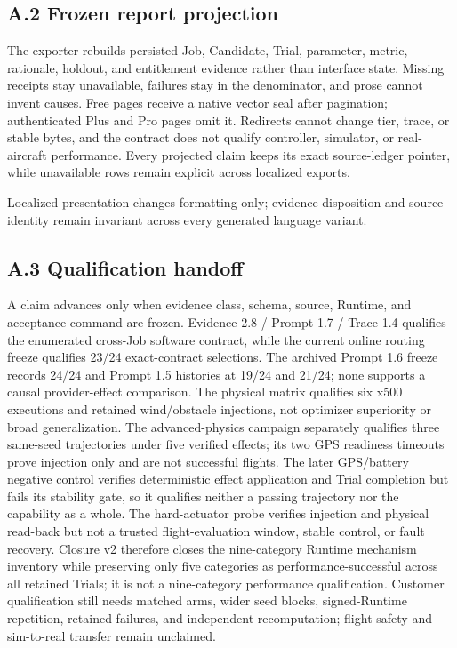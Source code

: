 \subsection{\texorpdfstring{\textbf{A.2 Frozen report
projection}}{A.2 Frozen report projection}}\label{a.2-frozen-report-projection}

The exporter rebuilds persisted Job, Candidate, Trial, parameter, metric,
rationale, holdout, and entitlement evidence rather than interface state.
Missing receipts stay unavailable, failures stay in the denominator, and
prose cannot invent causes. Free pages receive a native vector seal after
pagination; authenticated Plus and Pro pages omit it. Redirects cannot
change tier, trace, or stable bytes, and the contract does not qualify
controller, simulator, or real-aircraft performance. Every projected claim
keeps its exact source-ledger pointer, while unavailable rows remain explicit
across localized exports.

Localized presentation changes formatting only; evidence disposition and
source identity remain invariant across every generated language variant.

\subsection{\texorpdfstring{\textbf{A.3 Qualification
handoff}}{A.3 Qualification handoff}}\label{a.3-qualification-handoff}

A claim advances only when evidence class, schema, source, Runtime, and
acceptance command are frozen. Evidence 2.8 / Prompt 1.7 / Trace 1.4
qualifies the enumerated cross-Job software contract, while the current
online routing freeze qualifies 23/24 exact-contract selections. The
archived Prompt 1.6 freeze records 24/24 and Prompt 1.5 histories at
19/24 and 21/24; none supports a causal provider-effect comparison. The physical matrix qualifies six x500 executions and retained
wind/obstacle injections, not optimizer superiority or broad
generalization. The advanced-physics campaign separately qualifies three
same-seed trajectories under five verified effects; its two GPS
readiness timeouts prove injection only and are not successful flights.
The later GPS/battery negative control verifies deterministic effect
application and Trial completion but fails its stability gate, so it
qualifies neither a passing trajectory nor the capability as a whole.
The hard-actuator probe verifies injection and physical read-back but not
a trusted flight-evaluation window, stable control, or fault recovery.
Closure v2 therefore closes the nine-category Runtime mechanism inventory
while preserving only five categories as performance-successful across
all retained Trials; it is not a nine-category performance qualification.
Customer qualification still needs matched arms, wider
seed blocks, signed-Runtime repetition, retained failures, and independent
recomputation; flight safety and sim-to-real transfer remain unclaimed.

